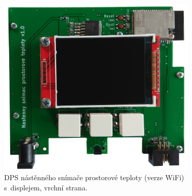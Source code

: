 \begin{figure}[H]
    \centering
    \includegraphics[width=0.85\textwidth]{images/nastenny-snimac-prostorove-teploty-wifi/dps-nastenny-snimac-prostorove-teploty-wifi-vrchni-cast-displej.png}
    \caption{DPS nástěnného snímače prostorové teploty (verze WiFi) s~displejem, vrchní strana.}
    \label{fig:dps-nastenny-snimac-prostorove-teploty-wifi-vrchni-cast-displej}
\end{figure}